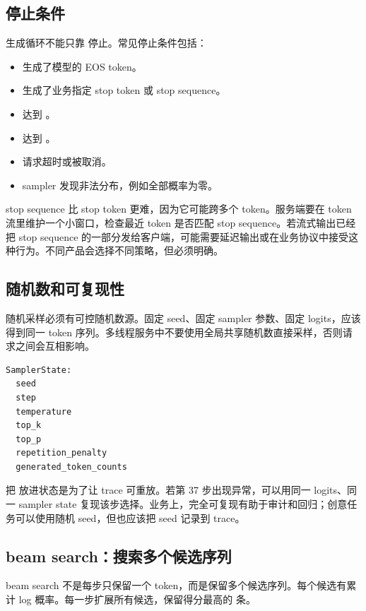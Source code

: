 \subsection{停止条件}

生成循环不能只靠  停止。常见停止条件包括：

\begin{itemize}
  \item 生成了模型的 EOS token。
  \item 生成了业务指定 stop token 或 stop sequence。
  \item 达到 。
  \item 达到 。
  \item 请求超时或被取消。
  \item sampler 发现非法分布，例如全部概率为零。
\end{itemize}

stop sequence 比 stop token 更难，因为它可能跨多个 token。服务端要在 token 流里维护一个小窗口，检查最近 token 是否匹配 stop sequence。若流式输出已经把 stop sequence 的一部分发给客户端，可能需要延迟输出或在业务协议中接受这种行为。不同产品会选择不同策略，但必须明确。

\subsection{随机数和可复现性}

随机采样必须有可控随机数源。固定 seed、固定 sampler 参数、固定 logits，应该得到同一 token 序列。多线程服务中不要使用全局共享随机数直接采样，否则请求之间会互相影响。

\begin{lstlisting}[numbers=none,caption={SamplerState 的最小字段}]
SamplerState:
  seed
  step
  temperature
  top_k
  top_p
  repetition_penalty
  generated_token_counts
\end{lstlisting}

把  放进状态是为了让 trace 可重放。若第 37 步出现异常，可以用同一 logits、同一 sampler state 复现该步选择。业务上，完全可复现有助于审计和回归；创意任务可以使用随机 seed，但也应该把 seed 记录到 trace。

\subsection{beam search：搜索多个候选序列}

beam search 不是每步只保留一个 token，而是保留多个候选序列。每个候选有累计 log 概率。每一步扩展所有候选，保留得分最高的  条。

